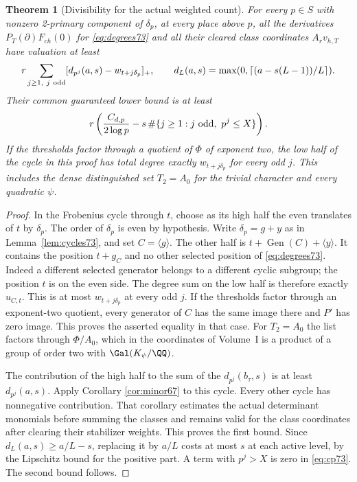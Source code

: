 \documentclass[a4paper,11pt]{article}
\newtheorem{theorem}[proposition]{Theorem}
\theoremstyle{definition}
\theoremstyle{remark}
\numberwithin{equation}{section}
\begin{document}
\begin{theorem}[Divisibility for the actual weighted count]\label{thm:count73}
For every \(p\in S\) with nonzero 2-primary component of
\(\delta_p\), at every place above \(p\), all the derivatives
\(P_T(\partial)F_{ch}(0)\) for \eqref{eq:degrees73} and all their
cleared class coordinates \(A_r v_{h,T}\) have valuation at least
\[
      r\sum_{j\ge1,\ j\ {\rm odd}}
                  [d_{p^j}(a,s)-w_{t+j\delta_p}]_+ ,\qquad
      d_L(a,s)=\max(0,\lceil(a-s(L-1))/L\rceil).
\]
Their common guaranteed lower bound is at least
\[
       r\left(\frac{C_{d,p}}{2\log p}
            -s\,\#\{j\ge1:j\ {\rm odd},\ p^j\le X\}\right).
\]
If the thresholds factor through a quotient of \(\Phi\) of
exponent two, the low half of the cycle in this proof has total
degree exactly \(w_{t+j\delta_p}\) for every odd \(j\).
This includes the dense distinguished set \(T_2=A_0\) for
the trivial character and every quadratic \(\psi\).
\end{theorem}
\begin{proof}
In the Frobenius cycle through \(t\), choose as its high half
the even translates of \(t\) by \(\delta_p\). The order of
\(\delta_p\) is even by hypothesis. Write
\(\delta_p=g+y\) as in Lemma~\ref{lem:cycles73}, and set
\(C=\langle g\rangle\). The other half is
\(t+\operatorname{Gen}(C)+\langle y\rangle\).
It contains the position \(t+g_C\) and no other selected
position of \eqref{eq:degrees73}. Indeed a different selected
generator belongs to a different cyclic subgroup; the position
\(t\) is on the even side. The degree sum on the low half is
therefore exactly \(u_{C,t}\). This is at most
\(w_{t+j\delta_p}\) at every odd \(j\).
If the thresholds factor through an exponent-two quotient,
every generator of \(C\) has the same image there and \(P'\)
has zero image. This proves the asserted equality in that case.
For \(T_2=A_0\) the list factors through \(\Phi/A_0\),
which in the coordinates of Volume~I is a product of a
group of order two with \(\Gal(K_\psi/\QQ)\).

The contribution of the high half to the sum of the
\(d_{p^j}(b_\tau,s)\) is at least \(d_{p^j}(a,s)\).
Apply Corollary \ref{cor:minor67} to this cycle. Every other cycle has
nonnegative contribution. That corollary estimates the actual
determinant monomials before summing the classes and remains
valid for the class coordinates after clearing their stabilizer
weights. This proves the first bound. Since
\(d_L(a,s)\ge a/L-s\), replacing it by \(a/L\) costs at
most \(s\) at each active level, by the Lipschitz bound for
the positive part. A term with \(p^j>X\) is zero in
\eqref{eq:cp73}. The second bound follows.
\end{proof}
\end{document}
